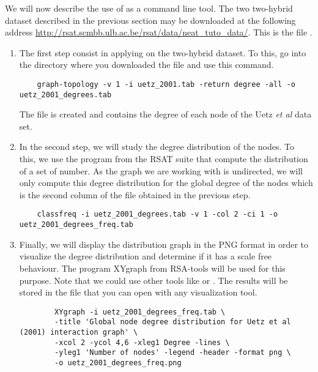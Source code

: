 We will now describe the use of  as a command line tool. 
The two two-hybrid dataset described
in the previous section may be downloaded at the following address \url{http://rsat.scmbb.ulb.ac.be/rsat/data/neat\_tuto\_data/}. 
This is the file .

\begin{enumerate}

\item The first step consist in applying  on the two-hybrid dataset. To this, go into the
directory where you downloaded the file  and use this command. 
	
	{\color{Blue} \begin{footnotesize} 
		\begin{verbatim}
	graph-topology -v 1 -i uetz_2001.tab -return degree -all -o uetz_2001_degrees.tab
		\end{verbatim} \end{footnotesize}
	}		
The file  is created and contains the degree of each node of the Uetz \textit{et al} data set.

\item In the second step, we will study the degree distribution of the nodes. To this, we use the program  from the RSAT suite that compute the distribution of a set of number. As the graph we are working with is undirected, we will only compute this degree distribution for the global degree of the nodes which is the second column of the file  obtained in the previous step.
	
	{\color{Blue} \begin{footnotesize} 
		\begin{verbatim}
	classfreq -i uetz_2001_degrees.tab -v 1 -col 2 -ci 1 -o uetz_2001_degrees_freq.tab
		\end{verbatim} \end{footnotesize}
	}		

\item Finally, we will display the distribution graph in the PNG format in order to visualize the degree distribution and determine if it has a scale free behaviour. The program XYgraph from RSA-tools will be used for this purpose. Note that we could use other tools like  or . The results will be stored in the file  that you can open with any visualization tool.

	{\color{Blue} \begin{footnotesize} 
		\begin{verbatim}
		XYgraph -i uetz_2001_degrees_freq.tab \
		-title 'Global node degree distribution for Uetz et al (2001) interaction graph' \
		-xcol 2 -ycol 4,6 -xleg1 Degree -lines \
		-yleg1 'Number of nodes' -legend -header -format png \
		-o uetz_2001_degrees_freq.png
		\end{verbatim} 
\end{footnotesize}
	}
\end{enumerate}


